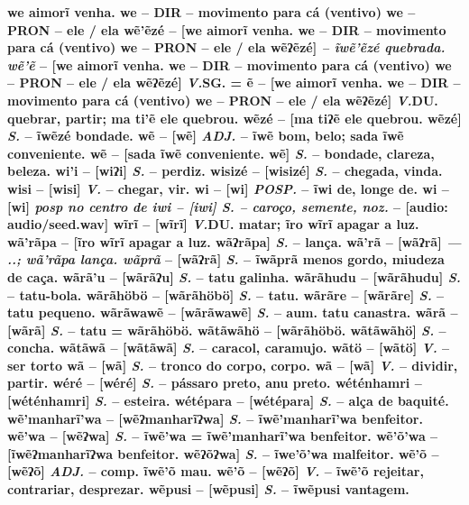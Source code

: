 \textbf{we aimorĩ venha. we -- {DIR -- {movimento para cá (ventivo) we -- {PRON -- {ele / ela wẽ'ẽzé} -- [we aimorĩ venha. we -- {DIR -- {movimento para cá (ventivo) we -- {PRON -- {ele / ela wẽʔẽzé] \textit{-- ĩwẽ'ẽzé quebrada. wẽ'ẽ} -- [we aimorĩ venha. we -- {DIR -- {movimento para cá (ventivo) we -- {PRON -- {ele / ela wẽʔẽzé] \textit{V.}SG. = ẽ} -- [we aimorĩ venha. we -- {DIR -- {movimento para cá (ventivo) we -- {PRON -- {ele / ela wẽʔẽzé] \textit{V.}DU. quebrar, partir;
\textbf{ma ti'ẽ ele quebrou. wẽzé} -- [ma tiʔẽ ele quebrou. wẽzé] \textit{S.} -- ĩwẽzé bondade.
\textbf{wẽ} -- [wẽ] \textit{ADJ.} -- ĩwẽ bom, belo;
\textbf{sada ĩwẽ conveniente. wẽ} -- [sada ĩwẽ conveniente. wẽ] \textit{S.} -- bondade, clareza, beleza.
\textbf{wi'i} -- [wiʔi] \textit{S.} -- perdiz.
\textbf{wisizé} -- [wisizé] \textit{S.} -- chegada, vinda.
\textbf{wisi} -- [wisi] \textit{V.} -- chegar, vir.
\textbf{wi} -- [wi] \textit{POSP.} -- ĩwi de, longe de.
\textbf{wi} -- [wi] \textit{posp {no centro de}
\textbf{iwi} -- [iwi] \textit{S.} -- caroço, semente, noz.} -- [audio: audio/seed.wav]
\textbf{wĩrĩ} -- [wĩrĩ] \textit{V.}DU. matar;
\textbf{ĩro wĩrĩ apagar a luz. wã'rãpa} -- [ĩro wĩrĩ apagar a luz. wãʔrãpa] \textit{S.} -- lança.
\textbf{wã'rã} -- [wãʔrã] \textit{--- ..; wã'rãpa lança. wãprã} -- [wãʔrã] \textit{S.} -- ĩwãprã menos gordo, miudeza de caça.
\textbf{wãrã'u} -- [wãrãʔu] \textit{S.} -- tatu galinha.
\textbf{wãrãhudu} -- [wãrãhudu] \textit{S.} -- tatu-bola.
\textbf{wãrãhöbö} -- [wãrãhöbö] \textit{S.} -- tatu.
\textbf{wãrãre} -- [wãrãre] \textit{S.} -- tatu pequeno.
\textbf{wãrãwawẽ} -- [wãrãwawẽ] \textit{S.} -- aum. tatu canastra.
\textbf{wãrã} -- [wãrã] \textit{S.} -- tatu =
\textbf{wãrãhöbö}. wãtãwãhö} -- [wãrãhöbö}. wãtãwãhö] \textit{S.} -- concha.
\textbf{wãtãwã} -- [wãtãwã] \textit{S.} -- caracol, caramujo.
\textbf{wãtö} -- [wãtö] \textit{V.} -- {ser torto}
\textbf{wã} -- [wã] \textit{S.} -- tronco do corpo, corpo.
\textbf{wã} -- [wã] \textit{V.} -- dividir, partir.
\textbf{wéré} -- [wéré] \textit{S.} -- pássaro preto, anu preto.
\textbf{wéténhamri} -- [wéténhamri] \textit{S.} -- esteira.
\textbf{wétépara} -- [wétépara] \textit{S.} -- alça de baquité.
\textbf{wẽ'manharĩ'wa} -- [wẽʔmanharĩʔwa] \textit{S.} -- ĩwẽ'manharĩ'wa benfeitor.
\textbf{wẽ'wa} -- [wẽʔwa] \textit{S.} -- ĩwẽ'wa =
\textbf{ĩwẽ'manharĩ'wa benfeitor. wẽ'õ'wa} -- [ĩwẽʔmanharĩʔwa benfeitor. wẽʔõʔwa] \textit{S.} -- ĩwe'õ'wa malfeitor.
\textbf{wẽ'õ} -- [wẽʔõ] \textit{ADJ.} -- comp. ĩwẽ'õ mau.
\textbf{wẽ'õ} -- [wẽʔõ] \textit{V.} -- ĩwẽ'õ rejeitar, contrariar, desprezar.
\textbf{wẽpusi} -- [wẽpusi] \textit{S.} -- ĩwẽpusi vantagem.
}}}}}}}}}}}}}
